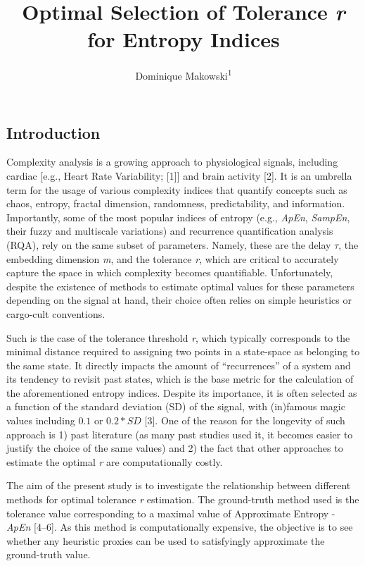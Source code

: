\documentclass[
  man]{apa6}
\title{\textbf{Optimal Selection of Tolerance \emph{r} for Entropy Indices}}
\author{Dominique Makowski\textsuperscript{1}}
\date{}
\affiliation{\vspace{0.5cm}\textsuperscript{1} School of Social Sciences, Nanyang Technological University, Singapore}
\begin{document}
\maketitle

\hypertarget{introduction}{%
\subsection{Introduction}\label{introduction}}

Complexity analysis is a growing approach to physiological signals, including cardiac {[}e.g., Heart Rate Variability; {[}1{]}{]} and brain activity {[}2{]}. It is an umbrella term for the usage of various complexity indices that quantify concepts such as chaos, entropy, fractal dimension, randomness, predictability, and information. Importantly, some of the most popular indices of entropy (e.g., \emph{ApEn}, \emph{SampEn}, their fuzzy and multiscale variations) and recurrence quantification analysis (RQA), rely on the same subset of parameters. Namely, these are the delay \(\tau\), the embedding dimension \emph{m}, and the tolerance \emph{r}, which are critical to accurately capture the space in which complexity becomes quantifiable. Unfortunately, despite the existence of methods to estimate optimal values for these parameters depending on the signal at hand, their choice often relies on simple heuristics or cargo-cult conventions.

Such is the case of the tolerance threshold \emph{r}, which typically corresponds to the minimal distance required to assigning two points in a state-space as belonging to the same state. It directly impacts the amount of ``recurrences'' of a system and its tendency to revisit past states, which is the base metric for the calculation of the aforementioned entropy indices. Despite its importance, it is often selected as a function of the standard deviation (SD) of the signal, with (in)famous magic values including \(0.1\) or \(0.2*SD\) {[}3{]}. One of the reason for the longevity of such approach is 1) past literature (as many past studies used it, it becomes easier to justify the choice of the same values) and 2) the fact that other approaches to estimate the optimal \emph{r} are computationally costly.

The aim of the present study is to investigate the relationship between different methods for optimal tolerance \emph{r} estimation. The ground-truth method used is the tolerance value corresponding to a maximal value of Approximate Entropy - \emph{ApEn} {[}4--6{]}. As this method is computationally expensive, the objective is to see whether any heuristic proxies can be used to satisfyingly approximate the ground-truth value.
\end{document}
